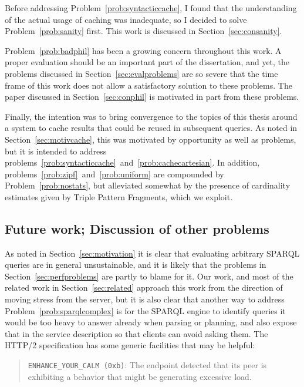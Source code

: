 Before addressing Problem~\ref{prob:syntacticcache}, I found that the
understanding of the actual usage of caching was inadequate, so I
decided to solve Problem~\ref{prob:sanity} first. This work is
discussed in Section~\ref{sec:consanity}.

Problem~\ref{prob:badphil} has been a growing concern throughout this
work. A proper evaluation should be an important part of the
dissertation, and yet, the problems discussed in
Section~\ref{sec:evalproblems} are so severe that the time frame of
this work does not allow a satisfactory solution to these
problems. The paper discussed in Section~\ref{sec:conphil} is
motivated in part from these problems.

Finally, the intention was to bring convergence to the topics of this
thesis around a system to cache results that could be reused in
subsequent queries. As noted in Section~\ref{sec:motivcache}, this was
motivated by opportunity as well as problems, but it is intended to
address
problems~\ref{prob:syntacticcache}~and~\ref{prob:cachecartesian}. In
addition, problems~\ref{prob:zipf}~and~\ref{prob:uniform} are
compounded by Problem~\ref{prob:nostats}, but alleviated somewhat by
the presence of cardinality estimates given by Triple Pattern
Fragments, which we exploit. 





\subsection{Future work; Discussion of other problems}

As noted in Section~\ref{sec:motivation} it is clear that evaluating
arbitrary SPARQL queries are in general unsustainable, and it is
likely that the problems in Section~\ref{sec:perfproblems} are partly
to blame for it. Our work, and most of the related work in
Section~\ref{sec:related} approach this work from the direction of
moving stress from the server, but it is also clear that another way
to address Problem~\ref{prob:sparqlcomplex} is for the SPARQL engine
to identify queries it would be too heavy to answer already when
parsing or planning, and also expose that in the service description
so that clients can avoid asking them. The HTTP/2 specification
\cite{rfc7540} has some generic facilities that may be helpful: 

\begin{quote}
\texttt{ENHANCE\_YOUR\_CALM (0xb)}:  The endpoint detected that its peer is
      exhibiting a behavior that might be generating excessive load.
\end{quote}

